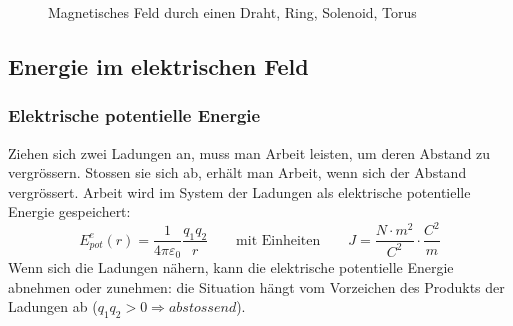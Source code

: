 \documentclass[11pt]{article}
\begin{document}
\begin{figure}[h]
\captionsetup{labelformat=empty}
\caption{Magnetisches Feld durch einen Draht, Ring, Solenoid, Torus}
\end{figure}

\subsection{Energie im elektrischen Feld}

\subsubsection{Elektrische potentielle Energie}

Ziehen sich zwei Ladungen an, muss man Arbeit leisten, um deren Abstand zu vergr{\"o}ssern. Stossen sie sich ab, erh{\"a}lt man Arbeit, wenn sich der Abstand vergr{\"o}ssert. \newline
Arbeit wird im System der Ladungen als elektrische potentielle Energie gespeichert:
\begin{equation*}
	E_{pot}^e(r) = \frac{1}{4\pi\varepsilon_0}\frac{q_1 q_2}{r} \qquad\text{mit Einheiten}\qquad J = \frac{N\cdot m^2}{C^2}\cdot\frac{C^2}{m}
\end{equation*}
Wenn sich die Ladungen n{\"a}hern, kann die elektrische potentielle Energie abnehmen oder zunehmen: die Situation h{\"a}ngt vom Vorzeichen des Produkts der Ladungen ab ($q_1 q_2 > 0 \Rightarrow abstossend$). \newline
\end{document}
